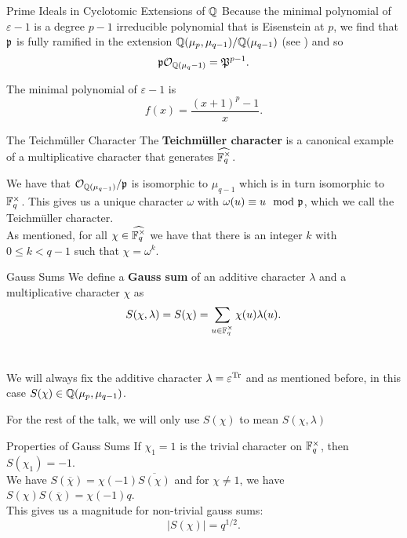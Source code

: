 \documentclass[presentation]{beamer}
\begin{document}
\begin{frame}{Prime Ideals in Cyclotomic Extensions of $\mathbb{Q}$}
Because the minimal polynomial of $\varepsilon - 1$ is a degree $p-1$ irreducible polynomial that is Eisenstein at $p$, we find that $\mathfrak{p}$ is fully ramified in the extension $\mathbb{Q}(\mu_p, \mu_{q-1}) / \mathbb{Q}(\mu_{q-1})$ (see \cite{Serre1979}) and so \[\mathfrak{p} \mathcal{O}_{\mathbb{Q}(\mu_q-1)} = \mathfrak{P}^{p-1}.\]

\pause
\vspace{0.5cm}
The minimal polynomial of $\varepsilon - 1$ is \[f(x) = \frac{(x+1)^p -1}{x}.\]
\end{frame}


\begin{frame}{The Teichm\"uller Character}
The \textbf{Teichm\"uller character} is a canonical example of a multiplicative character that generates $\widehat{\mathbb{F}_q^\times}$.\\
\pause
\vspace{0.5cm}

We have that $\mathcal{O}_{\mathbb{Q}(\mu_{q-1})} / \mathfrak{p}$ is isomorphic to $\mu_{q-1}$ which is in turn isomorphic to $\mathbb{F}_q^\times$. This gives us a unique character $\omega$ with $\omega(u) \equiv u \mod {\mathfrak{p}}$, which we call the Teichm\"uller character.
\\
\pause
\vspace{0.5cm}
As mentioned, for all $\chi \in \widehat{\mathbb{F}_q^\times}$ we have that there is an integer $k$ with $0 \leq k < q-1$ such that $\chi = \omega^k$.

\end{frame}

\begin{frame}{Gauss Sums}
We define a \textbf{Gauss sum} of an additive character $\lambda$ and a multiplicative character $\chi$ as \[S(\chi, \lambda) = S(\chi) = \sum_{u \in \mathbb{F}_q^\times} \chi(u) \lambda(u).\]
\\
\pause
\vspace{0.5cm}

We will always fix the additive character $\lambda = \varepsilon^{\textrm{Tr}}$ and as mentioned before, in this case $S(\chi) \in \mathbb{Q}(\mu_p, \mu_{q-1})$.\\
\vspace{0.5cm}

For the rest of the talk, we will only use $S(\chi)$ to mean $S(\chi, \lambda)$
\end{frame}

\begin{frame}{Properties of Gauss Sums}
If $\chi_1 = 1$ is the trivial character on $\mathbb{F}_q^\times$, then $S(\chi_1) = -1$.\\
\vspace{0.5cm}
We have $S(\overline{\chi}) = \chi(-1)\overline{S(\chi)}$ and for $\chi \neq 1$, we have $S(\chi) S(\overline{\chi}) = \chi(-1) q$.
\\
\pause
\vspace{0.5cm}
This gives us a magnitude for non-trivial gauss sums: 
\[ |S(\chi)| = q^{1/2}.\]
\end{frame}
\end{document}
